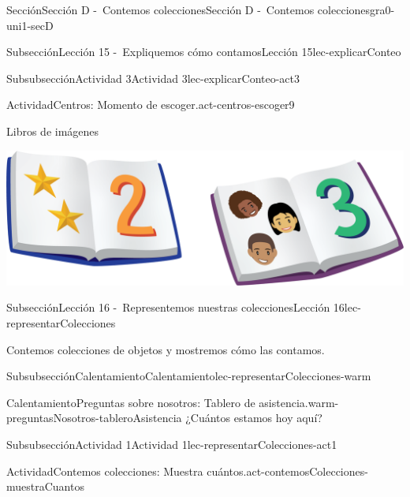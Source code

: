 \documentclass[twoside,10pt,]{article}
\begin{document}
\begin{sectionptx}{Sección}{Sección D -~Contemos colecciones}{}{Sección D -~Contemos colecciones}{}{}{gra0-uni1-secD}
\begin{subsectionptx}{Subsección}{Lección 15 -~Expliquemos cómo contamos}{}{Lección 15}{}{}{lec-explicarConteo}
\begin{subsubsectionptx}{Subsubsección}{Actividad 3}{}{Actividad 3}{}{}{lec-explicarConteo-act3}
\begin{activity}{Actividad}{Centros: Momento de escoger.}{act-centros-escoger9}
\begin{sidebyside}{2}{0.025}{0.025}{0.05}
\begin{sbspanel}{0.45}
\end{sbspanel}%
\begin{sbspanel}{0.45}%
Libros de imágenes%
\par
\includegraphics[width=\linewidth]{external/png-source/K.1.D Beta Student Workbooks.Books.png}
\end{sbspanel}%
\end{sidebyside}%
\end{activity}%
\end{subsubsectionptx}
\end{subsectionptx}
%
%
\typeout{************************************************}
\typeout{************************************************}
%
\begin{subsectionptx}{Subsección}{Lección 16 -~Representemos nuestras colecciones}{}{Lección 16}{}{}{lec-representarColecciones}
\begin{introduction}{}%
Contemos colecciones de objetos y mostremos cómo las contamos.%
\end{introduction}%
%
%
\typeout{************************************************}
\typeout{************************************************}
%
\begin{subsubsectionptx}{Subsubsección}{Calentamiento}{}{Calentamiento}{}{}{lec-representarColecciones-warm}
\begin{exploration}{Calentamiento}{Preguntas sobre nosotros: Tablero de asistencia.}{warm-preguntasNosotros-tableroAsistencia}%
¿Cuántos estamos hoy aquí?%
\end{exploration}%
\end{subsubsectionptx}
%
%
\typeout{************************************************}
\typeout{************************************************}
%
\begin{subsubsectionptx}{Subsubsección}{Actividad 1}{}{Actividad 1}{}{}{lec-representarColecciones-act1}
\begin{activity}{Actividad}{Contemos colecciones: Muestra cuántos.}{act-contemosColecciones-muestraCuantos}%

\end{activity}
\end{subsubsectionptx}
\end{subsectionptx}
\end{sectionptx}
\end{document}
